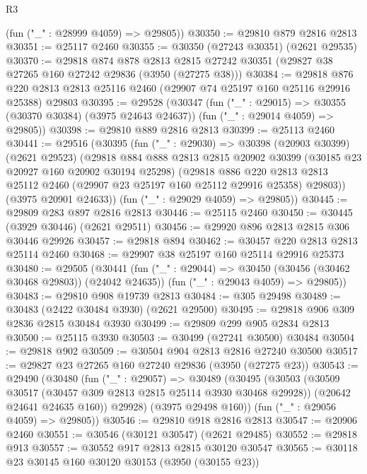 \begin{lexlean}{R3}
\begin{coremodule}
      (fun ("_" : @28999 @4059) => @29805))
@30350 := @29810 @879 @2816 @2813
@30351 := @25117 @2460
@30355 := @30350 (@27243 @30351) (@2621 @29535)
@30370 := @29818
    @874
    @878
    @2813
    @2815
    @27242
    @30351
    (@29827 @38 @27265 @160 @27242 @29836 (@3950 (@27275 @38)))
@30384 := @29818
    @876
    @220
    @2813
    @2813
    @25116
    @2460
    (@29907 @74 @25197 @160 @25116 @29916 @25388)
    @29803
@30395 := @29528
    (@30347
      (fun ("_" : @29015) => @30355 (@30370 @30384) (@3975 @24643 @24637))
      (fun ("_" : @29014 @4059) => @29805))
@30398 := @29810 @889 @2816 @2813
@30399 := @25113 @2460
@30441 := @29516
    (@30395
      (fun ("_" : @29030) =>
      @30398
        (@20903 @30399)
        (@2621 @29523)
        (@29818
          @884
          @888
          @2813
          @2815
          @20902
          @30399
          (@30185 @23 @20927 @160 @20902 @30194 @25298)
          (@29818
            @886
            @220
            @2813
            @2813
            @25112
            @2460
            (@29907 @23 @25197 @160 @25112 @29916 @25358)
            @29803))
        (@3975 @20901 @24633))
      (fun ("_" : @29029 @4059) => @29805))
@30445 := @29809 @283 @897 @2816 @2813
@30446 := @25115 @2460
@30450 := @30445 (@3929 @30446) (@2621 @29511)
@30456 := @29920 @896 @2813 @2815 @306 @30446 @29926
@30457 := @29818 @894
@30462 := @30457 @220 @2813 @2813 @25114 @2460
@30468 := @29907 @38 @25197 @160 @25114 @29916 @25373
@30480 := @29505
    (@30441
      (fun ("_" : @29044) => @30450 (@30456 (@30462 @30468 @29803)) (@24042 @24635))
      (fun ("_" : @29043 @4059) => @29805))
@30483 := @29810 @908 @19739 @2813
@30484 := @305 @29498
@30489 := @30483 (@2422 @30484 @3930) (@2621 @29500)
@30495 := @29818 @906 @309 @2836 @2815 @30484 @3930
@30499 := @29809 @299 @905 @2834 @2813
@30500 := @25115 @3930
@30503 := @30499 (@27241 @30500) @30484
@30504 := @29818 @902
@30509 := @30504 @904 @2813 @2816 @27240 @30500
@30517 := @29827 @23 @27265 @160 @27240 @29836 (@3950 (@27275 @23))
@30543 := @29490
    (@30480
      (fun ("_" : @29057) =>
      @30489
        (@30495
          (@30503
            (@30509 @30517 (@30457 @309 @2813 @2815 @25114 @3930 @30468 @29928))
            (@20642 @24641 @24635 @160))
          @29928)
        (@3975 @29498 @160))
      (fun ("_" : @29056 @4059) => @29805))
@30546 := @29810 @918 @2816 @2813
@30547 := @20906 @2460
@30551 := @30546 (@30121 @30547) (@2621 @29485)
@30552 := @29818 @913
@30557 := @30552 @917 @2813 @2815 @30120 @30547
@30565 := @30118 @23 @30145 @160 @30120 @30153 (@3950 (@30155 @23))

\end{coremodule}
\end{lexlean}
